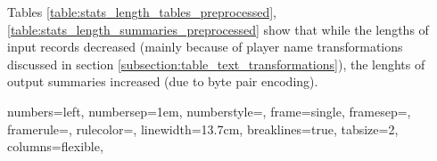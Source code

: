 Tables \ref{table:stats_length_tables_preprocessed}, \ref{table:stats_length_summaries_preprocessed} show that while the lengths of input records decreased (mainly because of player name transformations discussed in section \ref{subsection:table_text_transformations}), the lenghts of output summaries increased (due to byte pair encoding).

\begin{table}[h]
    \centering
    \caption{Length statistics of the preprocessed tables.} \label{table:stats_length_tables_preprocessed}
\end{table}

\begin{table}[!h]
    \centering
    \caption{Lenght statistics of the preprocessed summaries.} \label{table:stats_length_summaries_preprocessed}
\end{table}

{
    numbers=left,
    numbersep=1em,
    numberstyle=\tiny\color{red},
    frame=single,
    framesep=\fboxsep,
    framerule=\fboxrule,
    rulecolor=\color{red!20},
    linewidth=13.7cm,
    breaklines=true,
    tabsize=2,
    columns=flexible,
}

